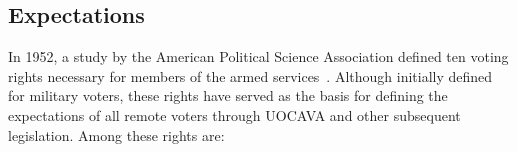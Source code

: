 

\subsection{Expectations}

In 1952, a study by the American Political Science Association defined
ten voting rights necessary for members of the armed
services~\cite{american1952findings}. Although initially defined for
military voters, these rights have served as the basis for defining
the expectations of all remote voters through UOCAVA and other
subsequent legislation. Among these rights are:

